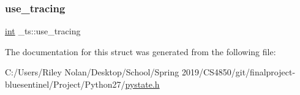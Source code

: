 \subsubsection{\texorpdfstring{use\_tracing}{use\_tracing}}
{\footnotesize\ttfamily \mbox{\hyperlink{warnings_8h_a74f207b5aa4ba51c3a2ad59b219a423b}{int}} \+\_\+ts\+::use\+\_\+tracing}



The documentation for this struct was generated from the following file\+:\begin{DoxyCompactItemize}
\item 
C\+:/\+Users/\+Riley Nolan/\+Desktop/\+School/\+Spring 2019/\+C\+S4850/git/finalproject-\/bluesentinel/\+Project/\+Python27/\mbox{\hyperlink{pystate_8h}{pystate.\+h}}\end{DoxyCompactItemize}
